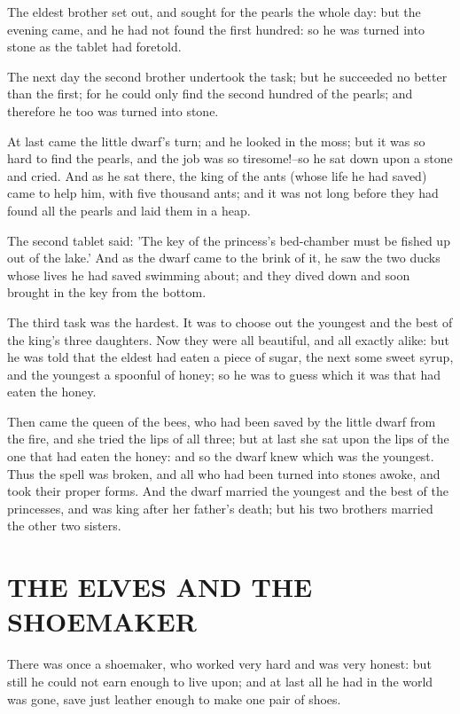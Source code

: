 \documentclass[12pt]{book}
\begin{document}
The eldest brother set out, and sought for the pearls the whole day:
but the evening came, and he had not found the first hundred: so he
was turned into stone as the tablet had foretold.

The next day the second brother undertook the task; but he succeeded
no better than the first; for he could only find the second hundred of
the pearls; and therefore he too was turned into stone.

At last came the little dwarf's turn; and he looked in the moss; but
it was so hard to find the pearls, and the job was so tiresome!--so he
sat down upon a stone and cried. And as he sat there, the king of the
ants (whose life he had saved) came to help him, with five thousand
ants; and it was not long before they had found all the pearls and
laid them in a heap.

The second tablet said: 'The key of the princess's bed-chamber must be
fished up out of the lake.' And as the dwarf came to the brink of it,
he saw the two ducks whose lives he had saved swimming about; and they
dived down and soon brought in the key from the bottom.

The third task was the hardest. It was to choose out the youngest and
the best of the king's three daughters. Now they were all beautiful,
and all exactly alike: but he was told that the eldest had eaten a
piece of sugar, the next some sweet syrup, and the youngest a spoonful
of honey; so he was to guess which it was that had eaten the honey.

Then came the queen of the bees, who had been saved by the little
dwarf from the fire, and she tried the lips of all three; but at last
she sat upon the lips of the one that had eaten the honey: and so the
dwarf knew which was the youngest. Thus the spell was broken, and all
who had been turned into stones awoke, and took their proper forms.
And the dwarf married the youngest and the best of the princesses, and
was king after her father's death; but his two brothers married the
other two sisters.



\chapter{THE ELVES AND THE SHOEMAKER}

There was once a shoemaker, who worked very hard and was very honest:
but still he could not earn enough to live upon; and at last all he
had in the world was gone, save just leather enough to make one pair
of shoes.
\end{document}
